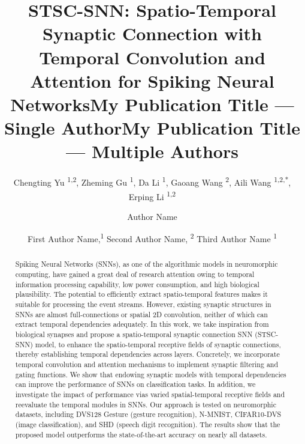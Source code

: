 \documentclass[letterpaper]{article} \usepackage[submission]{aaai23}  \usepackage{times}  \usepackage{helvet}  \usepackage{courier}  \usepackage[hyphens]{url}  \usepackage{graphicx} \urlstyle{rm} \def\UrlFont{\rm}  \usepackage{natbib}  \usepackage{caption} \frenchspacing  \setlength{\pdfpagewidth}{8.5in} \setlength{\pdfpageheight}{11in} \usepackage{algorithm}
\title{STSC-SNN: Spatio-Temporal Synaptic Connection with Temporal Convolution and Attention for Spiking Neural Networks}
\author{
Chengting Yu \textsuperscript{\rm 1,2},
    Zheming Gu \textsuperscript{\rm 1},
    Da Li \textsuperscript{\rm 1},
    Gaoang Wang \textsuperscript{\rm 2},
    Aili Wang \textsuperscript{\rm 1,2,*},
    Erping Li \textsuperscript{\rm 1,2}
}
\title{My Publication Title --- Single Author}
\author {
    Author Name
}
\title{My Publication Title --- Multiple Authors}
\author {
First Author Name,\textsuperscript{\rm 1}
    Second Author Name, \textsuperscript{\rm 2}
    Third Author Name \textsuperscript{\rm 1}
}
\begin{document}
\maketitle

\begin{abstract}
Spiking Neural Networks (SNNs), as one of the algorithmic models in neuromorphic computing, have gained a great deal of research attention owing to temporal information processing capability, low power consumption, and high biological plausibility.
The potential to efficiently extract spatio-temporal features makes it suitable for processing the event streams.
However, existing synaptic structures in SNNs are almost full-connections or spatial 2D convolution, neither of which can extract temporal dependencies adequately.
In this work, we take inspiration from biological synapses and propose a spatio-temporal synaptic connection SNN (STSC-SNN) model, to enhance the spatio-temporal receptive fields of synaptic connections, thereby establishing temporal dependencies across layers.
Concretely, we incorporate temporal convolution and attention mechanisms to implement synaptic filtering and gating functions.
We show that endowing synaptic models with temporal dependencies can improve the performance of SNNs on classification tasks. In addition, we investigate the impact of performance vias varied spatial-temporal receptive fields and reevaluate the temporal modules in SNNs.
Our approach is tested on neuromorphic datasets, including DVS128 Gesture (gesture recognition), N-MNIST, CIFAR10-DVS (image classification), and SHD (speech digit recognition). The results show that the proposed model outperforms the state-of-the-art accuracy on nearly all datasets.
\end{abstract}
\end{document}

